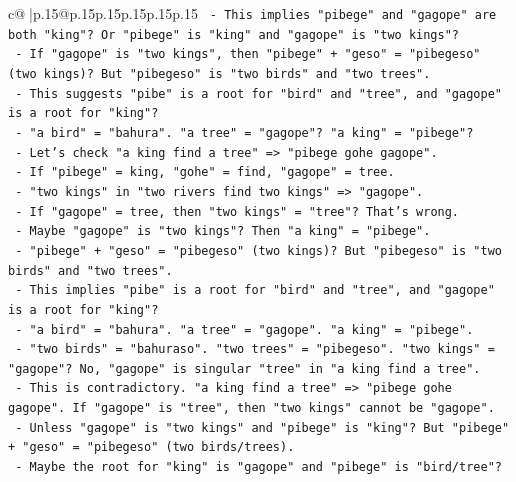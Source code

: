 \documentclass{article}
\begin{document}
{\begin{supertabular}{c@{$\;$}|p{.15\linewidth}@{}p{.15\linewidth}p{.15\linewidth}p{.15\linewidth}p{.15\linewidth}p{.15\linewidth}}
{{{\texttt{                        {-} This implies "pibege" and "gagope" are both "king"? Or "pibege" is "king" and "gagope" is "two kings"?} \\
\texttt{                        {-} If "gagope" is "two kings", then "pibege" + "geso" = "pibegeso" (two kings)? But "pibegeso" is "two birds" and "two trees".} \\
\texttt{                        {-} This suggests "pibe" is a root for "bird" and "tree", and "gagope" is a root for "king"?} \\
\texttt{                        {-} "a bird" = "bahura". "a tree" = "gagope"? "a king" = "pibege"?} \\
\texttt{                        {-} Let's check "a king find a tree" => "pibege gohe gagope".} \\
\texttt{                          {-} If "pibege" = king, "gohe" = find, "gagope" = tree.} \\
\texttt{                        {-} "two kings" in "two rivers find two kings" => "gagope".} \\
\texttt{                          {-} If "gagope" = tree, then "two kings" = "tree"? That's wrong.} \\
\texttt{                          {-} Maybe "gagope" is "two kings"? Then "a king" = "pibege".} \\
\texttt{                          {-} "pibege" + "geso" = "pibegeso" (two kings)? But "pibegeso" is "two birds" and "two trees".} \\
\texttt{                          {-} This implies "pibe" is a root for "bird" and "tree", and "gagope" is a root for "king"?} \\
\texttt{                          {-} "a bird" = "bahura". "a tree" = "gagope". "a king" = "pibege".} \\
\texttt{                          {-} "two birds" = "bahuraso". "two trees" = "pibegeso". "two kings" = "gagope"? No, "gagope" is singular "tree" in "a king find a tree".} \\
\texttt{                          {-} This is contradictory. "a king find a tree" => "pibege gohe gagope". If "gagope" is "tree", then "two kings" cannot be "gagope".} \\
\texttt{                          {-} Unless "gagope" is "two kings" and "pibege" is "king"? But "pibege" + "geso" = "pibegeso" (two birds/trees).} \\
\texttt{                          {-} Maybe the root for "king" is "gagope" and "pibege" is "bird/tree"?} \\
}}}
\end{supertabular}}
\end{document}
